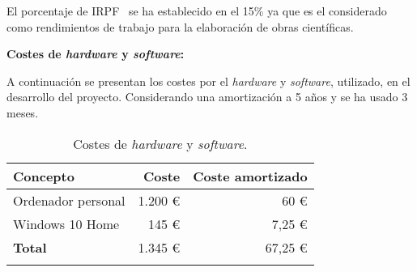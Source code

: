 El porcentaje de IRPF~\cite{IRPF} se ha establecido en el 15\% ya que es el considerado como rendimientos de trabajo para la elaboración de obras científicas.

\textbf{Costes de \emph{hardware} y \emph{software}:}

A continuación se presentan los costes por el \emph{hardware} y \emph{software}, utilizado, en el desarrollo del proyecto. Considerando una amortización a 5 años y se ha usado 3 meses.

\begin{longtable}[]{@{}lrr@{}}
\toprule
\begin{minipage}[b]{0.4\columnwidth}\raggedright\strut
\textbf{Concepto}\strut
\end{minipage} & \begin{minipage}[b]{0.18\columnwidth}\raggedright\strut
\textbf{Coste}\strut
\end{minipage} & \begin{minipage}[b]{0.32\columnwidth}\raggedright\strut
\textbf{Coste amortizado}\strut
\end{minipage}\tabularnewline
\midrule
\endhead
\begin{minipage}[t]{0.4\columnwidth}\raggedright\strut
Ordenador personal\strut
\end{minipage} & \begin{minipage}[t]{0.18\columnwidth}\raggedright\strut
1.200 \euro{}\strut
\end{minipage} & \begin{minipage}[t]{0.32\columnwidth}\raggedright\strut
60 \euro{}\strut
\end{minipage}\tabularnewline
\begin{minipage}[t]{0.4\columnwidth}\raggedright\strut
Windows 10 Home\strut
\end{minipage} & \begin{minipage}[t]{0.18\columnwidth}\raggedright\strut
145 \euro{}\strut
\end{minipage} & \begin{minipage}[t]{0.32\columnwidth}\raggedright\strut
7,25 \euro{}\strut
\end{minipage}\tabularnewline
\midrule
\begin{minipage}[t]{0.4\columnwidth}\raggedright\strut
\textbf{Total}\strut
\end{minipage} & \begin{minipage}[t]{0.18\columnwidth}\raggedright\strut
1.345 \euro{}\strut
\end{minipage} & \begin{minipage}[t]{0.32\columnwidth}\raggedright\strut
67,25 \euro{}\strut
\end{minipage}\tabularnewline
\bottomrule
\caption{Costes de \emph{hardware} y \emph{software}.}
\end{longtable}

